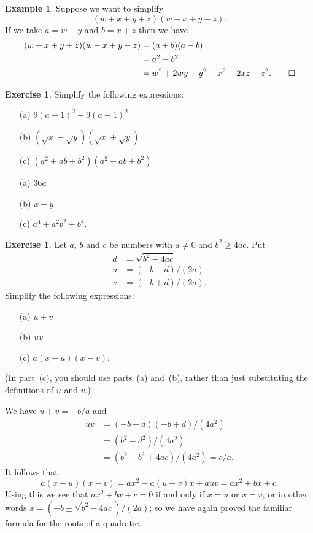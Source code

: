 \documentclass[a4paper]{book}
\theoremstyle{definition}
\newtheorem{example}[theorem]{Example}
\newtheorem{exercise}[theorem]{Exercise}
\renewenvironment{solution}{\SolutionInline}{\endSolutionInline}
\begin{document}
\begin{example}
 Suppose we want to simplify
 \[ (w+x+y+z)(w-x+y-z). \]
 If we take $a=w+y$ and $b=x+z$ then we have
 \begin{align*}
  (w+x+y+z)(w-x+y-z) &= (a+b)(a-b) \\
                     &= a^2 - b^2 \\
                     &= w^2 + 2wy + y^2 - x^2 - 2xz - z^2. \qed
 \end{align*}
\end{example}

\begin{exercise}
 Simplify the following expressions:
 \begin{itemize}
  \item[(a)] $9(a+1)^2 - 9(a-1)^2$
  \item[(b)] $(\sqrt{x} - \sqrt{y})(\sqrt{x} + \sqrt{y})$
  \item[(c)] $(a^2+ab+b^2)(a^2-ab+b^2)$
 \end{itemize}
\end{exercise}
\begin{solution}
 \begin{itemize}
  \item[(a)] $36a$
  \item[(b)] $x-y$
  \item[(c)] $a^4+a^2b^2+b^4$.
 \end{itemize}
\end{solution}

\begin{exercise}
 Let $a$, $b$ and $c$ be numbers with $a\neq 0$ and $b^2\geq 4ac$.
 Put
 \begin{align*}
  d &= \sqrt{b^2 - 4ac} \\
  u &= (-b-d)/(2a) \\
  v &= (-b+d)/(2a).
 \end{align*}
 Simplify the following expressions:
 \begin{itemize}
  \item[(a)] $u+v$
  \item[(b)] $uv$
  \item[(c)] $a(x-u)(x-v)$. 
 \end{itemize}
 (In part~(c), you should use parts~(a) and~(b), rather than just
 substituting the definitions of $u$ and $v$.)
\end{exercise}
\begin{solution}
 We have $u+v=-b/a$ and
 \begin{align*}
  uv &= (-b-d)(-b+d)/(4a^2) \\
     &= (b^2-d^2)/(4a^2) \\
     &= (b^2 - b^2 + 4ac)/(4a^2) = c/a.
 \end{align*}
 It follows that
 \[ a(x-u)(x-v) = a x^2 - a(u+v)x + auv =
     a x^2 + b x + c.
 \]
 Using this we see that $ax^2+bx+c=0$ if and only if $x=u$ or $x=v$,
 or in other words $x=(-b\pm\sqrt{b^2-4ac})/(2a)$; so we have again
 proved the familiar formula for the roots of a quadratic.
\end{solution}
\end{document}
